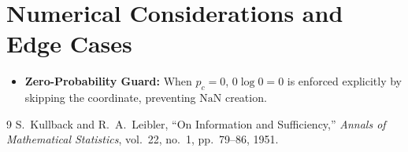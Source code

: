 \documentclass[11pt]{article}
\begin{document}
\section{Numerical Considerations and Edge Cases}
\label{sec:numerical}

\begin{itemize}
    \item \textbf{Zero-Probability Guard:} When $p_c = 0$, $0 \log 0 = 0$ is enforced explicitly by skipping the coordinate, preventing $\mathrm{NaN}$ creation.
\end{itemize}

\begin{thebibliography}{9}
 S.~Kullback and R.~A.~Leibler, ``On Information and Sufficiency,'' \emph{Annals of Mathematical Statistics}, vol.~22, no.~1, pp.~79--86, 1951.
\end{thebibliography}
\end{document}
